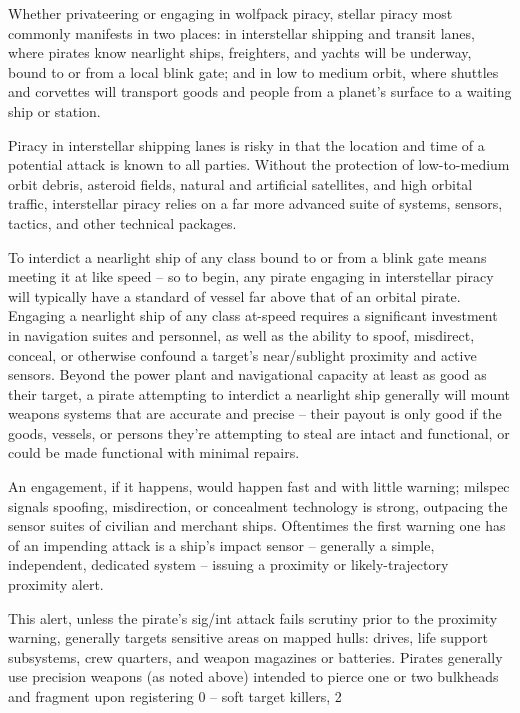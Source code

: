 Whether privateering or engaging in wolfpack piracy, stellar piracy most commonly manifests in  
two places: in interstellar shipping and transit lanes, where pirates know nearlight ships,  
freighters, and yachts will be underway, bound to or from a local blink gate; and in low to  
medium orbit, where shuttles and corvettes will transport goods and people from a planet’s  
surface to a waiting ship or station. 
 

Piracy in interstellar shipping lanes is risky in that the location and time of a potential attack is  
known to all parties. Without the protection of low-to-medium orbit debris, asteroid fields, natural  
and artificial satellites, and high orbital traffic, interstellar piracy relies on a far more advanced  
suite of systems, sensors, tactics, and other technical packages. 
 

To interdict a nearlight ship of any class bound to or from a blink gate means meeting it at like  
speed -- so to begin, any pirate engaging in interstellar piracy will typically have a standard of  
vessel far above that of an orbital pirate. Engaging a nearlight ship of any class at-speed requires  
a significant investment in navigation suites and personnel, as well as the ability to spoof,  
misdirect, conceal, or otherwise confound a target’s near/sublight proximity and active sensors.  
Beyond the power plant and navigational capacity at least as good as their target, a pirate  
attempting to interdict a nearlight ship generally will mount weapons systems that are accurate  
and precise -- their payout is only good if the goods, vessels, or persons they’re attempting to  
steal are intact and functional, or could be made functional with minimal repairs. 
 

                                                                                                         


An engagement, if it happens, would happen fast and with little warning; milspec signals  
spoofing, misdirection, or concealment technology is strong, outpacing the sensor suites of  
civilian and merchant ships. Oftentimes the first warning one has of an impending attack is a  
ship’s impact sensor -- generally a simple, independent, dedicated system -- issuing a proximity  
or likely-trajectory proximity alert. 
 

This alert, unless the pirate’s sig/int attack fails scrutiny prior to the proximity warning, generally  
targets sensitive areas on mapped hulls: drives, life support subsystems, crew quarters, and  
weapon magazines or batteries. Pirates generally use precision weapons (as noted above)  
intended to pierce one or two bulkheads and fragment upon registering 0  -- soft target killers,  
                                                                                            2  

